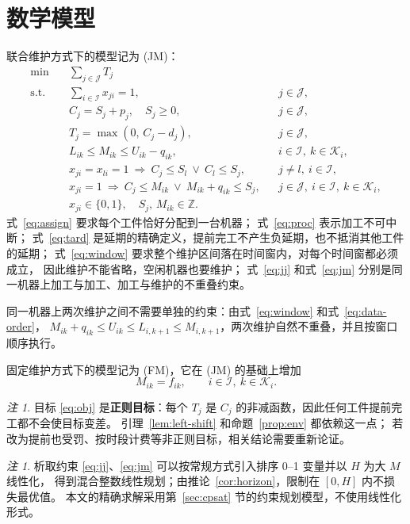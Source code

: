 \documentclass[11pt,oneside,notitlepage]{ctexrep}
\theoremstyle{definition}
\theoremstyle{remark}
\newtheorem{remark}[definition]{注}
\newcommand{\cJ}{\mathcal{J}}
\newcommand{\cI}{\mathcal{I}}
\newcommand{\cK}{\mathcal{K}}
\begin{document}
\section{数学模型}

联合维护方式下的模型记为 (JM)：
\begin{align}
\min\quad & \sum_{j\in\cJ} T_j \label{eq:obj}\\
\text{s.t.}\quad
& \sum_{i\in\cI} x_{ji}=1, && j\in\cJ, \label{eq:assign}\\
& C_j=S_j+p_j,\quad S_j\ge 0, && j\in\cJ, \label{eq:proc}\\
& T_j=\max(0,\,C_j-d_j), && j\in\cJ, \label{eq:tard}\\
& L_{ik}\le M_{ik}\le U_{ik}-q_{ik}, && i\in\cI,\ k\in\cK_i, \label{eq:window}\\
& x_{ji}=x_{li}=1\ \Rightarrow\ C_j\le S_l\ \lor\ C_l\le S_j, && j\ne l,\ i\in\cI, \label{eq:jj}\\
& x_{ji}=1\ \Rightarrow\ C_j\le M_{ik}\ \lor\ M_{ik}+q_{ik}\le S_j, && j\in\cJ,\ i\in\cI,\ k\in\cK_i, \label{eq:jm}\\
& x_{ji}\in\{0,1\},\quad S_j,\,M_{ik}\in\mathbb{Z}. && \label{eq:domain}
\end{align}
式~\eqref{eq:assign} 要求每个工件恰好分配到一台机器；
式~\eqref{eq:proc} 表示加工不可中断；
式~\eqref{eq:tard} 是延期的精确定义，提前完工不产生负延期，也不抵消其他工件的延期；
式~\eqref{eq:window} 要求整个维护区间落在时间窗内，对每个时间窗都必须成立，
因此维护不能省略，空闲机器也要维护；
式~\eqref{eq:jj} 和式~\eqref{eq:jm} 分别是同一机器上加工与加工、加工与维护的不重叠约束。

同一机器上两次维护之间不需要单独的约束：由式~\eqref{eq:window} 和式~\eqref{eq:data-order}，
$M_{ik}+q_{ik}\le U_{ik}\le L_{i,k+1}\le M_{i,k+1}$，两次维护自然不重叠，并且按窗口顺序执行。

固定维护方式下的模型记为 (FM)，它在 (JM) 的基础上增加
\begin{equation}
M_{ik}=f_{ik},\qquad i\in\cI,\ k\in\cK_i. \label{eq:fixed}
\end{equation}

\begin{remark}
目标 \eqref{eq:obj} 是\textbf{正则目标}：每个 $T_j$ 是 $C_j$ 的非减函数，因此任何工件提前完工都不会使目标变差。
引理~\ref{lem:left-shift} 和命题~\ref{prop:env} 都依赖这一点；
若改为提前也受罚、按时段计费等非正则目标，相关结论需要重新论证。
\end{remark}

\begin{remark}
析取约束 \eqref{eq:jj}、\eqref{eq:jm} 可以按常规方式引入排序 0--1 变量并以 $H$ 为大 $M$ 线性化，
得到混合整数线性规划；由推论~\ref{cor:horizon}，限制在 $[0,H]$ 内不损失最优值。
本文的精确求解采用第~\ref{sec:cpsat} 节的约束规划模型，不使用线性化形式。
\end{remark}
\end{document}
